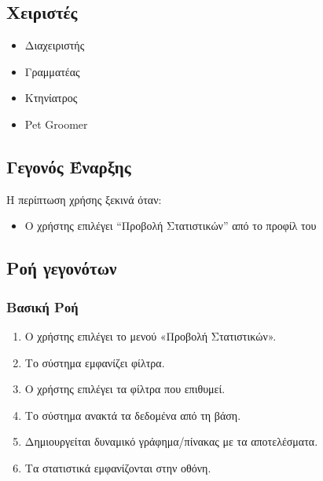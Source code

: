 \documentclass[12pt,a4paper,twoside]{book}
\begin{document}
\subsection{Χειριστές}
\begin{itemize}
  \item Διαχειριστής
  \item Γραμματέας
  \item Κτηνίατρος
  \item Pet Groomer
\end{itemize}

\subsection{Γεγονός Έναρξης}
Η περίπτωση χρήσης ξεκινά όταν:
\begin{itemize}
  \item Ο χρήστης επιλέγει “Προβολή Στατιστικών” από το προφίλ του   %
\end{itemize}

\subsection{Ροή γεγονότων}

\subsubsection{Βασική Ροή}
\begin{enumerate}
  \item Ο χρήστης επιλέγει το μενού «Προβολή Στατιστικών».  %
  \item Το σύστημα εμφανίζει φίλτρα. %
  \item Ο χρήστης επιλέγει τα φίλτρα που επιθυμεί.   %
  \item Το σύστημα ανακτά τα δεδομένα από τη βάση.  %
  \item Δημιουργείται δυναμικό γράφημα/πίνακας με τα αποτελέσματα.  %
  \item Τα στατιστικά εμφανίζονται στην οθόνη. %
\end{enumerate}
\end{document}
